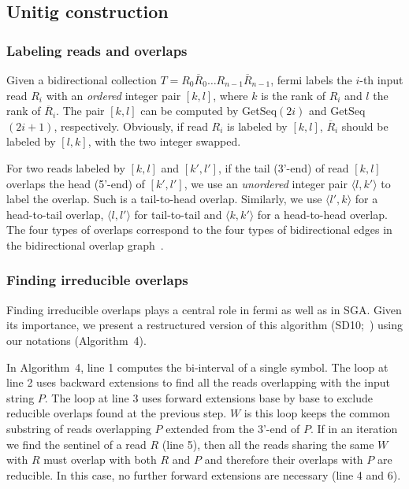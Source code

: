 \documentclass{bioinfo}
\begin{document}
\begin{methods}
\subsection{Unitig construction}

\subsubsection{Labeling reads and overlaps}
Given a bidirectional collection $T=R_0\overline{R}_0\ldots
R_{n-1}\overline{R}_{n-1}$, fermi labels the $i$-th input read $R_i$ with an
\emph{ordered} integer pair $[k,l]$, where $k$ is the rank of $R_i$
and $l$ the rank of $\overline{R}_i$. The pair $[k,l]$ can be computed by
{\sc GetSeq}$(2i)$ and {\sc GetSeq}$(2i+1)$, respectively. Obviously, if read
$R_i$ is labeled by $[k,l]$, $\overline{R}_i$ should be labeled by
$[l,k]$, with the two integer swapped.

For two reads labeled by $[k,l]$ and $[k',l']$, if the tail (3'-end) of read
$[k,l]$ overlaps the head (5'-end) of $[k',l']$, we use an \emph{unordered}
integer pair $\langle l,k'\rangle$ to label the overlap. Such is a tail-to-head
overlap. Similarly, we use $\langle l',k\rangle$ for a head-to-tail overlap,
$\langle l,l'\rangle$ for tail-to-tail and $\langle k,k'\rangle$ for a
head-to-head overlap. The four types of overlaps correspond to the four
types of bidirectional edges in the bidirectional overlap
graph~\citep{Myers:1995nx}.

\subsubsection{Finding irreducible overlaps}
Finding irreducible overlaps plays a central role in fermi as well as in SGA.
Given its importance, we present a restructured version of this algorithm
(SD10;~\citealt{Simpson:2010uq}) using our notations (Algorithm~4).

In Algorithm~4, line 1 computes the bi-interval of a single symbol. The loop at
line 2 uses backward extensions to find all the reads overlapping with the
input string $P$. The loop at line 3 uses forward extensions base by base to exclude
reducible overlaps found at the previous step. $W$ is this loop keeps
the common substring of reads overlapping $P$ extended from the 3'-end of $P$. If 
in an iteration we find the sentinel of a read $R$ (line 5), then all the reads sharing
the same $W$ with $R$ must overlap with both $R$ and $P$ and therefore
their overlaps with $P$ are reducible. In this case, no further forward
extensions are necessary (line 4 and 6).


\end{methods}
\end{document}
